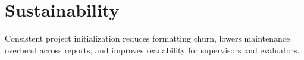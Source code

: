 \section{Sustainability}
\label{sec:sustainability}

Consistent project initialization reduces formatting churn, lowers maintenance overhead across reports, and improves readability for supervisors and evaluators\cite{pmbok_guide}.
